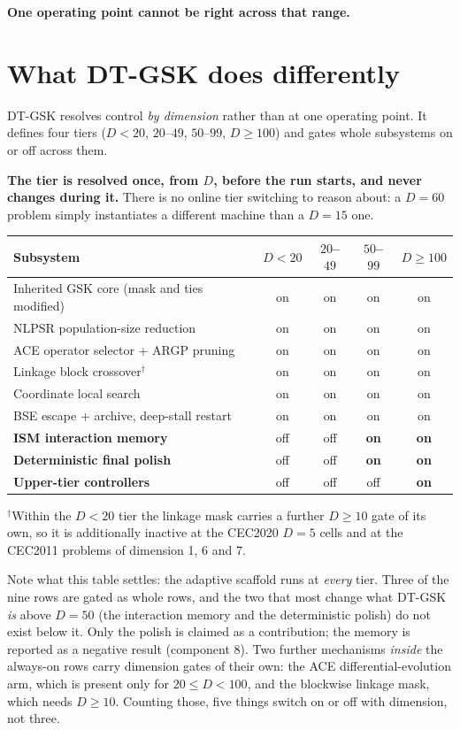 \documentclass[11pt,a4paper]{article}
\newcommand{\hl}[1]{\textbf{#1}}
\begin{document}
\hl{One operating point cannot be right across that range.}

\section{What DT-GSK does differently}

DT-GSK resolves control \emph{by dimension} rather than at one operating
point. It defines four tiers ($D<20$, $20$--$49$, $50$--$99$, $D\geq100$)
and gates whole subsystems on or off across them.

\hl{The tier is resolved once, from $D$, before the run starts, and never
changes during it.} There is no online tier switching to reason about: a
$D=60$ problem simply instantiates a different machine than a $D=15$ one.

\begin{center}
\small
\begin{tabular}{@{}lcccc@{}}
\toprule
\textbf{Subsystem} & $D{<}20$ & $20$--$49$ & $50$--$99$ & $D{\geq}100$ \\
\midrule
Inherited GSK core (mask and ties modified) & on & on & on & on \\
NLPSR population-size reduction & on & on & on & on \\
ACE operator selector + ARGP pruning & on & on & on & on \\
Linkage block crossover$^{\dagger}$ & on & on & on & on \\
Coordinate local search & on & on & on & on \\
BSE escape + archive, deep-stall restart & on & on & on & on \\
\textbf{ISM interaction memory} & off & off & \textbf{on} & \textbf{on} \\
\textbf{Deterministic final polish} & off & off & \textbf{on} & \textbf{on} \\
\textbf{Upper-tier controllers} & off & off & off & \textbf{on} \\
\bottomrule
\end{tabular}
\end{center}

{\footnotesize $^{\dagger}$Within the $D{<}20$ tier the linkage mask carries a
further $D\geq10$ gate of its own, so it is additionally inactive at the
CEC2020 $D{=}5$ cells and at the CEC2011 problems of dimension 1, 6 and 7.}

Note what this table settles: the adaptive scaffold runs at \emph{every}
tier. Three of the nine rows are gated as whole rows, and the two that most
change what DT-GSK \emph{is} above $D=50$ (the interaction memory and the
deterministic polish) do not exist below it. Only the polish is claimed as a
contribution; the memory is reported as a negative result (component 8). Two further mechanisms \emph{inside} the
always-on rows carry dimension gates of their own: the ACE differential-evolution
arm, which is present only for $20\leq D<100$, and the blockwise linkage mask,
which needs $D\geq10$. Counting those, five things switch on or off with
dimension, not three.
\end{document}
